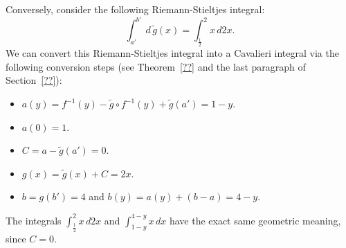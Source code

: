 \documentclass[twoside,reqno,11pt]{fcaa-var} %
\begin{document}
Conversely, consider the following Riemann-Stieltjes integral:
\begin{equation}
\int_{a'}^{b'} \,d\,\widetilde{g}(x) = \int_{\frac{1}{2}}^2 x\,d2x.
\end{equation}
We can convert this Riemann-Stieltjes integral into a Cavalieri integral via the following conversion steps (see Theorem~\ref{??} and the last paragraph of Section~\ref{??}):
\begin{itemize}
 \item $a(y) = f^{-1}(y) - \widetilde{g}\circ f^{-1}(y)+ \widetilde{g}(a') = 1-y$.
 \item $a(0) = 1$.
 \item $C = a - \widetilde{g}(a') = 0$.
 \item $g(x) = \widetilde{g}(x) + C = 2x$.
 \item $b = g(b') = 4$ and $b(y) = a(y) + (b-a) = 4-y$.
\end{itemize}
The integrals $\int_{\frac{1}{2}}^{2} x\,d2x$  and $\int_{1-y}^{4-y} x\,dx$ have the exact same geometric meaning, since $C=0$. 
\end{document}
